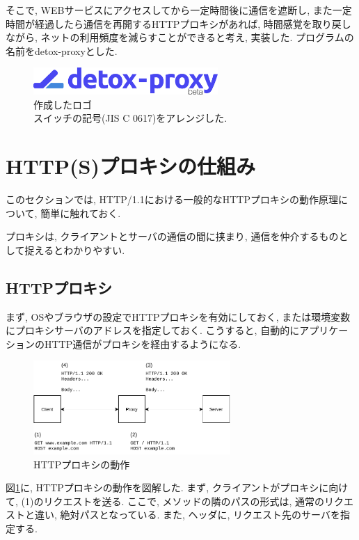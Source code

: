 \documentclass[10pt,a4paper,uplatex,a4j,dvipdfmx]{jsarticle}
\begin{document}
\begin{multicols}{2}
    そこで, WEBサービスにアクセスしてから一定時間後に通信を遮断し, また一定時間が経過したら通信を再開するHTTPプロキシがあれば, 時間感覚を取り戻しながら, ネットの利用頻度を減らすことができると考え, 実装した.
プログラムの名前をdetox-proxyとした.
    
    \begin{figure}[H]
      \center
      \includegraphics[width=7cm]{img/logo.eps}
      \caption{作成したロゴ \\ スイッチの記号(JIS C 0617)をアレンジした.}
    \end{figure}

    \section{HTTP(S)プロキシの仕組み}
    
    このセクションでは, HTTP/1.1における一般的なHTTPプロキシの動作原理について, 簡単に触れておく.

    プロキシは, クライアントとサーバの通信の間に挟まり, 通信を仲介するものとして捉えるとわかりやすい.
    
    \subsection{HTTPプロキシ}
    \label{sec:http}
    まず, OSやブラウザの設定でHTTPプロキシを有効にしておく, または環境変数にプロキシサーバのアドレスを指定しておく.
    こうすると, 自動的にアプリケーションのHTTP通信がプロキシを経由するようになる.
    \begin{figure}[H]
      \center
      \includegraphics[width=7.5cm]{img/proxyhttp.pdf}
      \caption{HTTPプロキシの動作 \label{img:proxy:http}}
    \end{figure}
    
    図\ref{img:proxy:http}に, HTTPプロキシの動作を図解した.
    まず, クライアントがプロキシに向けて, (1)のリクエストを送る.
    ここで, メソッドの隣のパスの形式は, 通常のリクエストと違い, 絶対パスとなっている. また, ヘッダに, リクエスト先のサーバを指定する.
    

\end{multicols}
\end{document}
